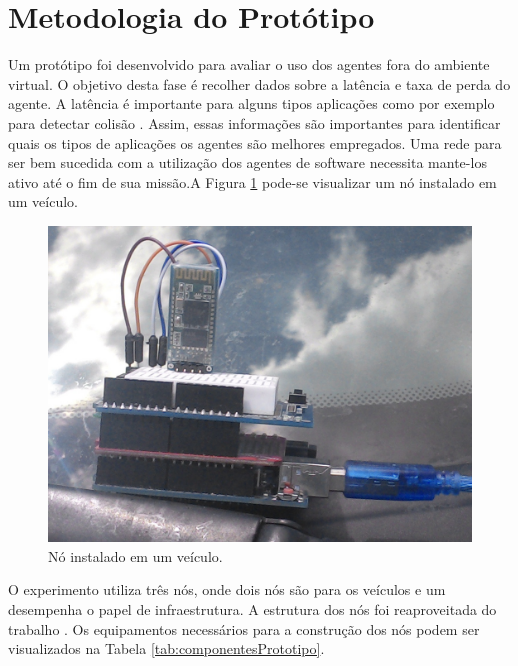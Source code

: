 \section{Metodologia do Protótipo}
\label{sec:prototipoExperimento}

Um protótipo foi desenvolvido para avaliar o uso dos agentes fora do ambiente virtual. O objetivo desta fase é recolher dados sobre a latência e taxa de perda do agente. A latência é importante para alguns tipos aplicações como por exemplo para detectar colisão \cite{santanaMestrado:2014}. Assim, essas informações são importantes para identificar quais os tipos de aplicações os agentes são melhores empregados. Uma rede para ser bem sucedida com a utilização dos agentes de software necessita mante-los ativo até o fim de sua missão.A Figura \ref{fig:noInstaladoVeiculo} pode-se visualizar um nó instalado em um veículo.

\begin{figure}[htbp]
	\centering
	\includegraphics[scale=0.2]{metodologia/figuras/noInstaladoVeiculo.jpg}
	\caption{Nó instalado em um veículo.}
	\label{fig:noInstaladoVeiculo}
\end{figure}

O experimento utiliza três nós, onde dois nós são para os veículos e um desempenha o papel de infraestrutura. A estrutura dos nós foi reaproveitada do trabalho \cite{santanaMestrado:2014}. Os equipamentos necessários para a construção dos nós podem ser visualizados na Tabela \ref{tab:componentesPrototipo}. 

